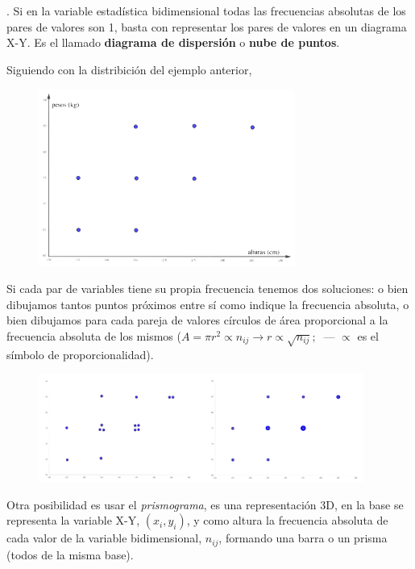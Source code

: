 \begin{definition}
.	Si en la variable estadística bidimensional 	todas las frecuencias absolutas de los pares de valores son 1, basta con representar los pares de valores en un diagrama X-Y. Es el llamado \textbf{diagrama de dispersión} o \textbf{nube de puntos}.

\vspace{2mm} Siguiendo con la distribición del ejemplo anterior, 

	\begin{figure}[H]
			\centering
			\includegraphics[width=0.75\textwidth]{imagenes/imagenes03/T03IM01.png}
	\end{figure}

Si cada par de variables tiene su propia frecuencia tenemos dos soluciones: o bien dibujamos tantos puntos próximos entre sí como indique la frecuencia absoluta, o bien dibujamos para cada pareja de valores círculos de área proporcional a la frecuencia absoluta de los mismos ($A=\pi r^2 \propto n_{ij} \to r \propto \sqrt{n_{ij}};\ $ --- \textcolor{gris}{$\propto$ es el símbolo de proporcionalidad}).

\begin{figure}[H]
			\centering
			\includegraphics[width=0.95\textwidth]{imagenes/imagenes03/T03IM02.png}
	\end{figure}

Otra posibilidad es usar el \emph{prismograma}, es una representación 3D, en la base se representa la variable X-Y, $(x_i,y_i)$, y como altura la frecuencia absoluta de cada valor de la variable bidimensional, $n_{ij}$, formando una barra o un prisma (todos de la misma base).


\end{definition}
